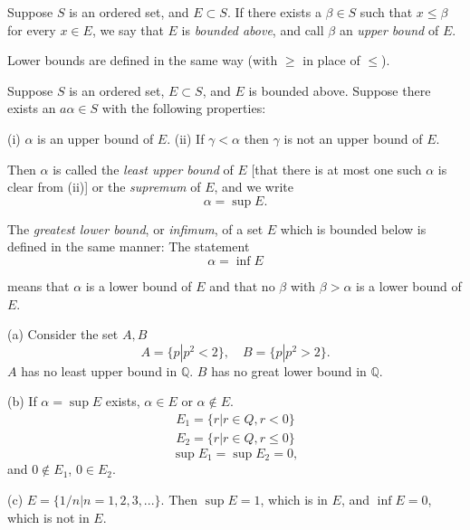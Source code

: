 \begin{Definition}
Suppose $S$ is an ordered set, and $E \subset S$. If there exists a
$\beta \in S$ such that $x \leq \beta$ for every $x \in E$, we say that $E$ is \emph{bounded above}, and call
$\beta$ an \emph{upper bound} of $E$.

Lower bounds are defined in the same way (with $\geq$ in place of $\leq$).
\end{Definition}

\begin{Definition}
Suppose $S$ is an ordered set, $E \subset S$, and $E$ is bounded above.
Suppose there exists an $a\alpha \in S$ with the following properties:

(i) $\alpha$ is an upper bound of $E$.
(ii) If $\gamma <\alpha$ then $\gamma$ is not an upper bound of $E$.

Then $\alpha$ is called the \emph{least upper bound} of $E$ [that there is at most one such
$\alpha$ is clear from (ii)] or the \emph{supremum} of $E$, and we write
\begin{equation*}
    \alpha = \sup E.
\end{equation*}

The \emph{greatest lower bound}, or \emph{infimum}, of a set $E$ which is bounded below
is defined in the same manner: The statement
\begin{equation*}
    \alpha = \inf E
\end{equation*}

means that $\alpha$ is a lower bound of $E$ and that no $\beta$ with $\beta > \alpha$ is a lower bound
of $E$.
\end{Definition}



\begin{Example}
(a) Consider the set $A, B$
    \begin{equation*}
        A = \{p|p^2 < 2\},\quad
        B = \{p|p^2 > 2\}.
    \end{equation*}
    $A$ has no least upper bound in $\mathbb{Q}$.
    $B$ has no great lower bound in $\mathbb{Q}$.
    
    (b) If $\alpha = \sup E$ exists, $\alpha\in E$ or $\alpha \notin E$.
    \begin{align*}
        E_1 = \{r |r\in Q, r < 0\}\\
        E_2 = \{r |r\in Q, r \leq 0\}
    \end{align*}
    \begin{equation*}
        \sup E_1 = \sup E_2 = 0,
    \end{equation*}
    and $0\not\in E_1$, $0\in E_2$.
    
    (c) $E = \{1/n | n = 1,2,3,...\}$. Then $\sup E = 1$, which is in $E$, and $\inf E = 0$, which is not in $E$.
\end{Example}

